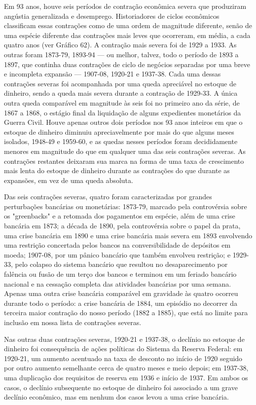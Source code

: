 \documentclass[a4paper,12pt]{article}[abntex2]
\begin{document}
Em 93 anos, houve seis períodos de contração econômica severa que produziram angústia generalizada e desemprego. Historiadores de ciclos econômicos classificam essas contrações como de uma ordem de magnitude diferente, senão de uma espécie diferente das contrações mais leves que ocorreram, em média, a cada quatro anos (ver Gráfico 62). A contração mais severa foi de 1929 a 1933. As outras foram 1873-79, 1893-94 — ou melhor, talvez, todo o período de 1893 a 1897, que continha duas contrações de ciclo de negócios separadas por uma breve e incompleta expansão — 1907-08, 1920-21 e 1937-38. Cada uma dessas contrações severas foi acompanhada por uma queda apreciável no estoque de dinheiro, sendo a queda mais severa durante a contração de 1929-33. A única outra queda comparável em magnitude às seis foi no primeiro ano da série, de 1867 a 1868, o estágio final da liquidação de alguns expedientes monetários da Guerra Civil. Houve apenas outros dois períodos nos 93 anos inteiros em que o estoque de dinheiro diminuiu apreciavelmente por mais do que alguns meses isolados, 1948-49 e 1959-60, e as quedas nesses períodos foram decididamente menores em magnitude do que em qualquer uma das seis contrações severas. As contrações restantes deixaram sua marca na forma de uma taxa de crescimento mais lenta do estoque de dinheiro durante as contrações do que durante as expansões, em vez de uma queda absoluta.

Das seis contrações severas, quatro foram caracterizadas por grandes perturbações bancárias ou monetárias: 1873-79, marcado pela controvérsia sobre os "greenbacks" e a retomada dos pagamentos em espécie, além de uma crise bancária em 1873; a década de 1890, pela controvérsia sobre o papel da prata, uma crise bancária em 1890 e uma crise bancária mais severa em 1893 envolvendo uma restrição concertada pelos bancos na conversibilidade de depósitos em moeda; 1907-08, por um pânico bancário que também envolveu restrição; e 1929-33, pelo colapso do sistema bancário que resultou no desaparecimento por falência ou fusão de um terço dos bancos e terminou em um feriado bancário nacional e na cessação completa das atividades bancárias por uma semana. Apenas uma outra crise bancária comparável em gravidade às quatro ocorreu durante todo o período: a crise bancária de 1884, um episódio no decorrer da terceira maior contração do nosso período (1882 a 1885), que está no limite para inclusão em nossa lista de contrações severas.

Nas outras duas contrações severas, 1920-21 e 1937-38, o declínio no estoque de dinheiro foi consequência de ações políticas do Sistema da Reserva Federal: em 1920-21, um aumento acentuado na taxa de desconto no início de 1920 seguido por outro aumento semelhante cerca de quatro meses e meio depois; em 1937-38, uma duplicação dos requisitos de reserva em 1936 e início de 1937. Em ambos os casos, o declínio subsequente no estoque de dinheiro foi associado a um grave declínio econômico, mas em nenhum dos casos levou a uma crise bancária.
\end{document}
